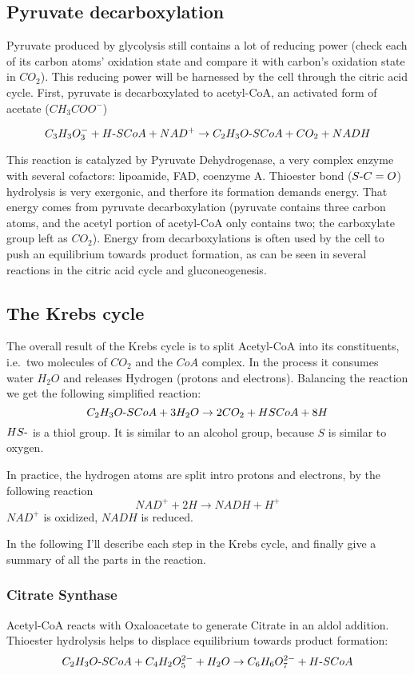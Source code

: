\documentclass{article}
\def\mhyphen{{\hbox{-}}}
\begin{document}
\subsection{Pyruvate decarboxylation}
Pyruvate produced by glycolysis still contains a lot of reducing power (check each of its
carbon atoms' oxidation state and compare it with carbon's oxidation state in $CO_2$). This
reducing power will be harnessed by the cell through the citric acid cycle. First,
pyruvate is decarboxylated to acetyl-CoA, an activated form of acetate ($CH_3COO^-$)

\[
    C_3H_3O_3^- + H{\mhyphen}SCoA + NAD^+ \rightarrow
    C_2H_3O{\mhyphen}SCoA + CO_2 + NADH
\]

This reaction is catalyzed by Pyruvate Dehydrogenase, a very complex enzyme with several
cofactors: lipoamide, FAD, coenzyme A. Thioester bond ($S{\mhyphen}C=O$) hydrolysis is very exergonic,
and therfore its formation demands energy. That energy comes from pyruvate decarboxylation
(pyruvate contains three carbon atoms, and the acetyl portion of acetyl-CoA only contains
two; the carboxylate group left as $CO_2$). Energy from decarboxylations is often used by the
cell to push an equilibrium towards product formation, as can be seen in several reactions
in the citric acid cycle and gluconeogenesis.

\subsection{The Krebs cycle}
The overall result of the Krebs cycle is to split Acetyl-CoA into its constituents, i.e.\
two molecules of $CO_2$ and the $CoA$ complex. In the process it consumes water $H_2O$ and
releases Hydrogen (protons and electrons). Balancing the reaction we get the following
simplified reaction:
\[
    C_2H_3O{\mhyphen}SCoA + 3H_2O \rightarrow 2CO_2 + HSCoA + 8H
\]
$HS{\mhyphen}$ is a thiol group. It is similar to an alcohol group, because $S$ is similar to
oxygen.

In practice, the hydrogen atoms are split intro protons and electrons, by the following
reaction
\[
    NAD^+ + 2H \rightarrow NADH + H^+
\]
$NAD^+$ is oxidized, $NADH$ is reduced.

In the following I'll describe each step in the Krebs cycle, and finally give a summary of
all the parts in the reaction.

\subsubsection{Citrate Synthase}
Acetyl-CoA reacts with Oxaloacetate to generate Citrate in an aldol addition.
Thioester hydrolysis helps to displace equilibrium towards product formation:
\[
    C_2H_3O{\mhyphen}SCoA + C_4H_2O_5^{2-} + H_2O \rightarrow
    C_6H_6O_7^{2-} + H{\mhyphen}SCoA
\]
\end{document}
